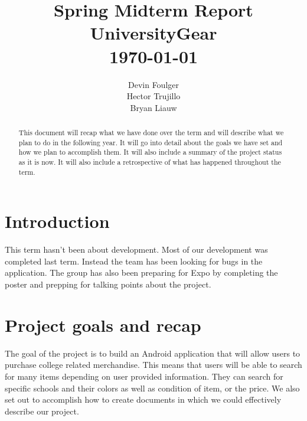 \documentclass[journal,compsoc, 10pt, draftclsnofoot, onecolumn]{IEEEtran}
\begin{document}
\title{\vspace{20em}Spring Midterm Report \\{\vspace{-1ex}\huge UniversityGear} \\
{\large \today}}
\author{\vspace{10ex}Devin Foulger \\{\vspace{-1ex}Hector Trujillo}
\\{\vspace{-1ex}Bryan Liauw}}

\begin{titlepage}

\maketitle
\thispagestyle{empty}

\begin{abstract}
This document will recap what we have done over the term and will describe 
what we plan to do in the following year. It will go into detail about the goals 
we have set and how we plan to accomplish them. It will also include a summary 
of the project status as it is now. It will also include a retrospective of what 
has happened throughout the term.
\end{abstract}

\end{titlepage}

\tableofcontents

\section{Introduction}
This term hasn't been about development. Most of our development was 
completed last term. Instead the team has been looking for bugs in the application. 
The group has also been preparing for Expo by completing the poster and prepping 
for talking points about the project.

\section{Project goals and recap}
The goal of the project is to build an Android application that will allow users 
to purchase college related merchandise. This means that users will be able to 
search for many items depending on user provided information. They can 
search for specific schools and their colors as well as condition of item, or 
the price. We also set out to accomplish how to create documents in which we 
could effectively describe our project. \newline
\end{document}
